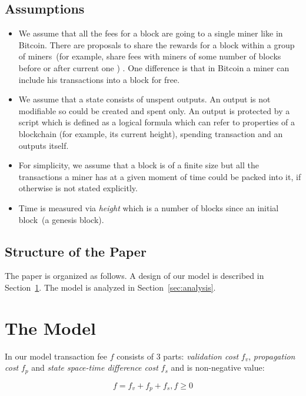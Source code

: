 \documentclass[]{llncs}   %
\newcommand{\authnote}[2]{\marginpar{\parbox{\marginparwidth}{\tiny %
  \textsf{#1 {\textcolor{blue}{notes: #2}}}}}%
  \textcolor{blue}{\textbf{\dag}}}
\newcommand{\authnote}[2]{
  \textsf{#1 \textcolor{blue}{: #2}}}
\newcommand{\authnote}[2]{}
\newcommand{\knote}[1]{{\authnote{\textcolor{green}{Alex notes}}{#1}}}
\begin{document}
\subsection{Assumptions}
\begin{itemize}
  \item{} We assume that all the fees for a block are going to a single miner like in Bitcoin. There are proposals to share the rewards for a block within a group of miners~(for example, share fees with miners of some number of blocks before or after current one \cite{eyal2016bitcoin, kogias2016enhancing})\knote{link to ByzCoin}. One difference is that in Bitcoin a miner can include his transactions into a block for free.
  \item{} We assume that a state consists of unspent outputs. An output is not modifiable so could be created and spent only. An output is protected by a script which is defined as a logical formula which can refer to properties of a blockchain (for example, its current height), spending transaction and an outputs itself. \knote{example} 
  \item{} For simplicity, we assume that a block is of a finite size but all the transactions a miner has at a given moment of time could be packed into it, if otherwise is not stated explicitly.
  \item{} Time is measured via \textit{height} which is a number of blocks since an initial block~(a genesis block). 
\end{itemize}

\subsection{Structure of the Paper}

The paper is organized as follows. A design of our model is described in Section~\ref{sec:model}. The model is analyzed in Section~\ref{sec:analysis}.  
\knote{finish}


\section{The Model}
\label{sec:model}

In our model transaction fee $f$ consists of 3 parts: \textit{validation cost} $f_v$, \textit{propagation cost} $f_p$ and \textit{state space-time difference cost} $f_s$ and is non-negative value:

\begin{equation}
f = f_v + f_p + f_s , f \ge 0
\end{equation}
\end{document}
